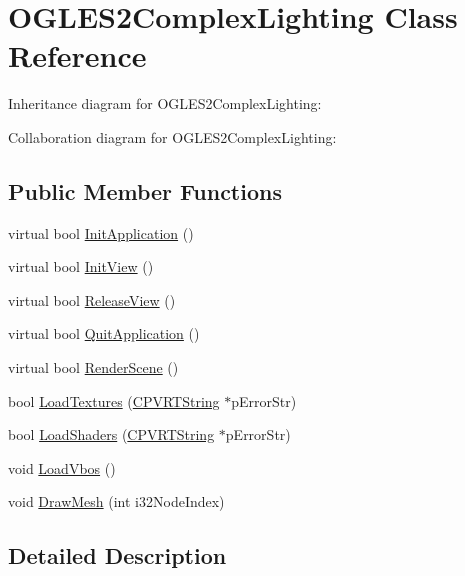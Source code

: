 \hypertarget{class_o_g_l_e_s2_complex_lighting}{\section{O\+G\+L\+E\+S2\+Complex\+Lighting Class Reference}
\label{class_o_g_l_e_s2_complex_lighting}
}


Inheritance diagram for O\+G\+L\+E\+S2\+Complex\+Lighting\+:


Collaboration diagram for O\+G\+L\+E\+S2\+Complex\+Lighting\+:
\subsection*{Public Member Functions}
\begin{DoxyCompactItemize}
\item 
virtual bool \hyperlink{class_o_g_l_e_s2_complex_lighting_af3a47ce02cbc48855bce2354359bdfaa}{Init\+Application} ()
\item 
virtual bool \hyperlink{class_o_g_l_e_s2_complex_lighting_a54ec27f464c3e2327f21ba8bdfae116c}{Init\+View} ()
\item 
virtual bool \hyperlink{class_o_g_l_e_s2_complex_lighting_af220dadffedc91b2a94acd2c8b416886}{Release\+View} ()
\item 
virtual bool \hyperlink{class_o_g_l_e_s2_complex_lighting_a49edebe26e9b911dcde4d6bc5c103c53}{Quit\+Application} ()
\item 
virtual bool \hyperlink{class_o_g_l_e_s2_complex_lighting_a6ae32066db380f292192074d3f444e5b}{Render\+Scene} ()
\item 
bool \hyperlink{class_o_g_l_e_s2_complex_lighting_aa8c23e0424664a985a50fc02165ba06f}{Load\+Textures} (\hyperlink{class_c_p_v_r_t_string}{C\+P\+V\+R\+T\+String} $\ast$p\+Error\+Str)
\item 
bool \hyperlink{class_o_g_l_e_s2_complex_lighting_aea1a2a7eab134daa60689c9e35d16ccc}{Load\+Shaders} (\hyperlink{class_c_p_v_r_t_string}{C\+P\+V\+R\+T\+String} $\ast$p\+Error\+Str)
\item 
void \hyperlink{class_o_g_l_e_s2_complex_lighting_a962747f8c928b38df26aa22462840a99}{Load\+Vbos} ()
\item 
void \hyperlink{class_o_g_l_e_s2_complex_lighting_a299e8f66874be343f559f31b62b71b3d}{Draw\+Mesh} (int i32\+Node\+Index)
\end{DoxyCompactItemize}


\subsection{Detailed Description}


